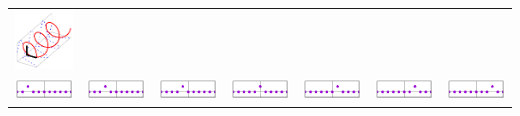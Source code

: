 \begin{tabular}{ccccccc}
	\includegraphics{monomial+3.png} \\
	\includegraphics{monoal-3.png} &
	\includegraphics{monoal-2.png} &
	\includegraphics{monoal-1.png} &
	\includegraphics{monoal+0.png} &
	\includegraphics{monoal+1.png} &
	\includegraphics{monoal+2.png} &
	\includegraphics{monoal+3.png} \\
\end{tabular}
